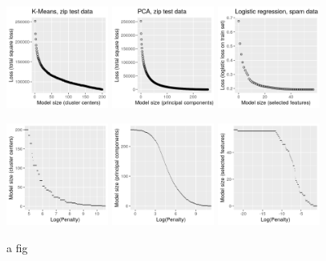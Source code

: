 \documentclass{article}
\begin{document}
\begin{figure}
  \centering
    \includegraphics[width=0.3\textwidth]{figure-kmeans-simple-loss.png}
    \includegraphics[width=0.3\textwidth]{figure-pca-simple-loss.png}
    \includegraphics[width=0.3\textwidth]{figure-regression-simple-loss.png}
    
    \includegraphics[width=0.3\textwidth]{figure-kmeans-simple-size.png}
    \includegraphics[width=0.3\textwidth]{figure-pca-simple-size.png}
    \includegraphics[width=0.3\textwidth]{figure-regression-simple-size.png}
  \caption{a fig}
\end{figure}
\end{document}
